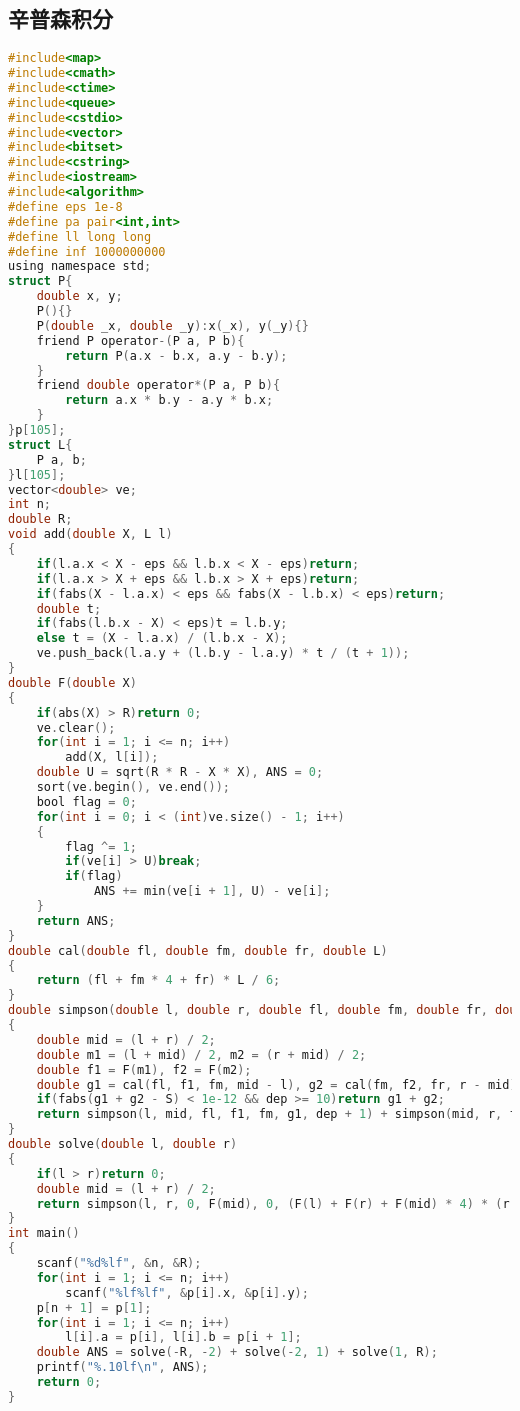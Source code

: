 \subsection{辛普森积分}
\begin{lstlisting}[language=C] 
#include<map>
#include<cmath>
#include<ctime>
#include<queue>
#include<cstdio>
#include<vector>
#include<bitset>
#include<cstring>
#include<iostream>
#include<algorithm>
#define eps 1e-8
#define pa pair<int,int>
#define ll long long
#define inf 1000000000
using namespace std;
struct P{
    double x, y;
    P(){}
    P(double _x, double _y):x(_x), y(_y){}
    friend P operator-(P a, P b){
        return P(a.x - b.x, a.y - b.y);
    }
    friend double operator*(P a, P b){
        return a.x * b.y - a.y * b.x;
    }
}p[105];
struct L{
    P a, b;
}l[105];
vector<double> ve;
int n;
double R;
void add(double X, L l)
{
    if(l.a.x < X - eps && l.b.x < X - eps)return;
    if(l.a.x > X + eps && l.b.x > X + eps)return;
    if(fabs(X - l.a.x) < eps && fabs(X - l.b.x) < eps)return;
    double t;
    if(fabs(l.b.x - X) < eps)t = l.b.y;
    else t = (X - l.a.x) / (l.b.x - X);    
    ve.push_back(l.a.y + (l.b.y - l.a.y) * t / (t + 1));
}
double F(double X)
{
    if(abs(X) > R)return 0;
    ve.clear();
    for(int i = 1; i <= n; i++)
        add(X, l[i]);
    double U = sqrt(R * R - X * X), ANS = 0;
    sort(ve.begin(), ve.end());
    bool flag = 0;
    for(int i = 0; i < (int)ve.size() - 1; i++)
    {
        flag ^= 1;
        if(ve[i] > U)break;
        if(flag)
            ANS += min(ve[i + 1], U) - ve[i];
    }
    return ANS;
}
double cal(double fl, double fm, double fr, double L)
{
    return (fl + fm * 4 + fr) * L / 6;
}
double simpson(double l, double r, double fl, double fm, double fr, double S, int dep)
{
    double mid = (l + r) / 2;
    double m1 = (l + mid) / 2, m2 = (r + mid) / 2;
    double f1 = F(m1), f2 = F(m2);
    double g1 = cal(fl, f1, fm, mid - l), g2 = cal(fm, f2, fr, r - mid);
    if(fabs(g1 + g2 - S) < 1e-12 && dep >= 10)return g1 + g2;
    return simpson(l, mid, fl, f1, fm, g1, dep + 1) + simpson(mid, r, fm, f2, fr, g2, dep + 1);    
}
double solve(double l, double r)
{
    if(l > r)return 0;
    double mid = (l + r) / 2;
    return simpson(l, r, 0, F(mid), 0, (F(l) + F(r) + F(mid) * 4) * (r - l) / 6, 0);
}
int main()
{
    scanf("%d%lf", &n, &R);
    for(int i = 1; i <= n; i++)
        scanf("%lf%lf", &p[i].x, &p[i].y);
    p[n + 1] = p[1];
    for(int i = 1; i <= n; i++)
        l[i].a = p[i], l[i].b = p[i + 1];
    double ANS = solve(-R, -2) + solve(-2, 1) + solve(1, R);
    printf("%.10lf\n", ANS);
    return 0;
}
\end{lstlisting} 
